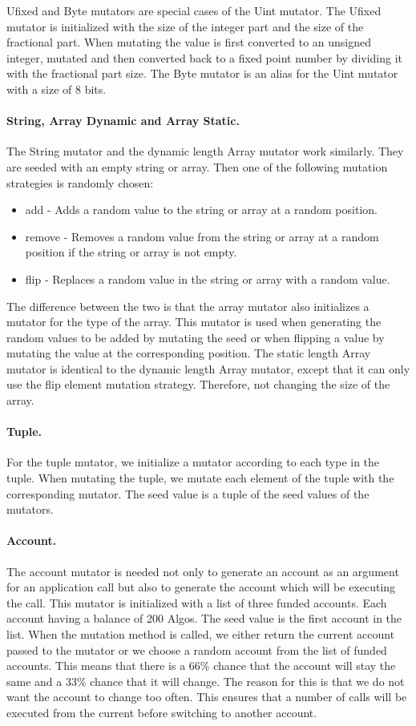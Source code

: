 Ufixed and Byte mutators are special cases of the Uint mutator. The Ufixed mutator is initialized with the size of the integer part and the size of the fractional part. When mutating the value is first converted to an unsigned integer, mutated and then converted back to a fixed point number by dividing it with the fractional part size. The Byte mutator is an alias for the Uint mutator with a size of 8 bits.

\paragraph{String, Array Dynamic and Array Static.}
The String mutator and the dynamic length Array mutator work similarly. They are seeded with an empty string or array. Then one of the following mutation strategies is randomly chosen:
\begin{itemize}
    \item add - Adds a random value to the string or array at a random position.
    \item remove - Removes a random value from the string or array at a random position if the string or array is not empty.
    \item flip - Replaces a random value in the string or array with a random value.
\end{itemize}

The difference between the two is that the array mutator also initializes a mutator for the type of the array.
This mutator is used when generating the random values to be added by mutating the seed or when flipping a value by mutating the value at the corresponding position.
The static length Array mutator is identical to the dynamic length Array mutator, except that it can only use the flip element mutation strategy.
Therefore, not changing the size of the array.

\paragraph{Tuple.}
For the tuple mutator, we initialize a mutator according to each type in the tuple.
When mutating the tuple, we mutate each element of the tuple with the corresponding mutator.
The seed value is a tuple of the seed values of the mutators.

\paragraph{Account.}
The account mutator is needed not only to generate an account as an argument for an application call but also to generate the account which will be executing the call.
This mutator is initialized with a list of three funded accounts.
Each account having a balance of 200 Algos.
The seed value is the first account in the list.
When the mutation method is called, we either return the current account passed to the mutator or we choose a random account from the list of funded accounts.
This means that there is a 66\% chance that the account will stay the same and a 33\% chance that it will change.
The reason for this is that we do not want the account to change too often.
This ensures that a number of calls will be executed from the current before switching to another account.


